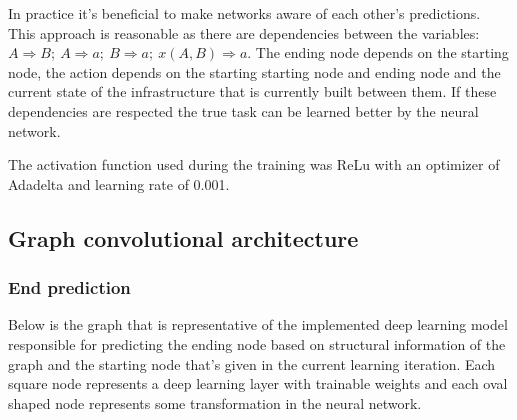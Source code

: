 \documentclass[
]{elteikthesis}[2023/04/10]
\begin{document}
In practice it's beneficial to make networks aware of each other's
predictions. This approach is reasonable as there are dependencies
between the variables: $A\Rightarrow B;\:A\Rightarrow a;\:B\Rightarrow a;\:x(A,B)\Rightarrow a$.
The ending node depends on the starting node, the action depends on
the starting starting node and ending node and the current state of
the infrastructure that is currently built between them. If these
dependencies are respected the true task can be learned better by
the neural network. 

The activation function used during the training was ReLu with an
optimizer of Adadelta and learning rate of 0.001. 

\pagebreak{}

\subsection{Graph convolutional architecture}

\subsubsection*{End prediction}

Below is the graph that is representative of the implemented deep
learning model responsible for predicting the ending node based on
structural information of the graph and the starting node that's given
in the current learning iteration. Each square node represents a deep
learning layer with trainable weights and each oval shaped node represents
some transformation in the neural network.
\end{document}
